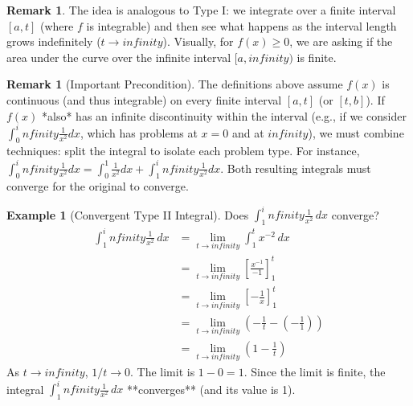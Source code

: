 \documentclass[11pt]{article}
\def\infty{infinity}%
\theoremstyle{definition}
\newtheorem{example}[theorem]{Example}
\newtheorem{remark}[theorem]{Remark}
\newcommand{\dx}{\, dx} %
\begin{document}
\begin{remark}
    The idea is analogous to Type I: we integrate over a finite interval $[a, t]$ (where $f$ is integrable) and then see what happens as the interval length grows indefinitely ($t \to \infty$). Visually, for $f(x) \ge 0$, we are asking if the area under the curve over the infinite interval $[a, \infty)$ is finite.
\end{remark}

\begin{remark}[Important Precondition]
    The definitions above assume $f(x)$ is continuous (and thus integrable) on every finite interval $[a, t]$ (or $[t, b]$). If $f(x)$ *also* has an infinite discontinuity within the interval (e.g., if we consider $\int_0^\infty \frac{1}{x^2} dx$, which has problems at $x=0$ and at $\infty$), we must combine techniques: split the integral to isolate each problem type. For instance, $\int_0^\infty \frac{1}{x^2} dx = \int_0^1 \frac{1}{x^2} dx + \int_1^\infty \frac{1}{x^2} dx$. Both resulting integrals must converge for the original to converge.
\end{remark}

\begin{example}[Convergent Type II Integral] \label{ex:1/x^2_infty}
    Does $\int_1^\infty \frac{1}{x^2} \dx$ converge?
    \begin{align*} \int_1^\infty \frac{1}{x^2} \dx &= \lim_{t \to \infty} \int_1^t x^{-2} \dx \\ &= \lim_{t \to \infty} \left[ \frac{x^{-1}}{-1} \right]_1^t \\ &= \lim_{t \to \infty} \left[ -\frac{1}{x} \right]_1^t \\ &= \lim_{t \to \infty} \left( -\frac{1}{t} - \left(-\frac{1}{1}\right) \right) \\ &= \lim_{t \to \infty} \left( 1 - \frac{1}{t} \right) \end{align*}
    As $t \to \infty$, $1/t \to 0$. The limit is $1 - 0 = 1$.
    Since the limit is finite, the integral $\int_1^\infty \frac{1}{x^2} \dx$ **converges** (and its value is 1).
\end{example}
\end{document}
